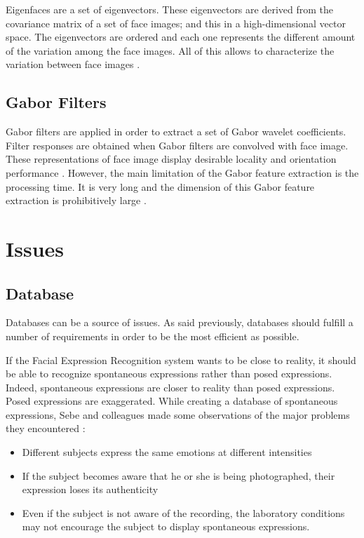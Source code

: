 \vspace{\baselineskip}
\noindent Eigenfaces are a set of eigenvectors. These eigenvectors are derived from the covariance matrix of a set of face images; and this in a high-dimensional vector space. The eigenvectors are ordered and each one represents the different amount of the variation among the face images. All of this allows to characterize the variation between face images \cite{TUR91}.
\newline

\subsection{Gabor Filters}

\vspace{\baselineskip}
\noindent Gabor filters are applied in order to extract a set of Gabor wavelet coefficients. Filter responses are obtained when Gabor filters are convolved with face image. These representations of face image display desirable locality and orientation performance \cite{JEM09}. However, the main limitation of the Gabor feature extraction is the processing time. It is very long and the dimension of this Gabor feature extraction is prohibitively large \cite{PRA09}.
\newline

\section{Issues}

\vspace{\baselineskip}
\subsection{Database}

\vspace{\baselineskip}
\noindent Databases can be a source of issues. As said previously, databases should fulfill a number of requirements in order to be the most efficient as possible. 
\newline

\noindent If the Facial Expression Recognition system wants to be close to reality, it should be able to recognize spontaneous expressions rather than posed expressions. Indeed, spontaneous expressions are closer to reality than posed expressions. Posed expressions are exaggerated. While creating a database of spontaneous expressions, Sebe and colleagues \cite{SEB07} made some observations of the major problems they encountered \cite{BET12}:
\newline
\begin{itemize}
  \item Different subjects express the same emotions at different intensities
  \item If the subject becomes aware that he or she is being photographed, their expression loses its authenticity
  \item Even if the subject is not aware of the recording, the laboratory conditions may not encourage the subject to display spontaneous expressions.
\end{itemize}

